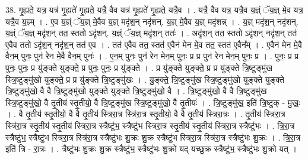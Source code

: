 \documentclass[17pt]{extarticle}
\begin{document}
38. गृ॒ह्यते॒ यत्र॒ यत्र॑ गृ॒ह्यते॑ गृ॒ह्यते॒ यत्रै॒ वैव यत्र॑ गृ॒ह्यते॑ गृ॒ह्यते॒ यत्रै॒व । . यत्रै॒ वैव यत्र॒ यत्रै॒व य॒ज्ञ्ं ॅय॒ज्ञ् मे॒व यत्र॒ यत्रै॒व य॒ज्ञ्म् । . ए॒व य॒ज्ञ्ं ॅय॒ज्ञ् मे॒वैव य॒ज्ञ् मदृ॑श॒न् नदृ॑शन्. य॒ज्ञ् मे॒वैव य॒ज्ञ् मदृ॑शन्न् । . य॒ज्ञ् मदृ॑श॒न् नदृ॑शन्. य॒ज्ञ्ं ॅय॒ज्ञ् मदृ॑श॒न् तत॒ स्ततो ऽदृ॑शन्. य॒ज्ञ्ं ॅय॒ज्ञ् मदृ॑श॒न् ततः॑ । . अदृ॑श॒न् तत॒ स्ततो ऽदृ॑श॒न् नदृ॑श॒न् तत॑ ए॒वैव ततो ऽदृ॑श॒न् नदृ॑श॒न् तत॑ ए॒व । . तत॑ ए॒वैव तत॒ स्तत॑ ए॒वैन॑ मेन मे॒व तत॒ स्तत॑ ए॒वैन᳚म् । . ए॒वैन॑ मेन मे॒वै वैन॒म् पुनः॒ पुन॑ रेन मे॒वै वैन॒म् पुनः॑ । . ए॒न॒म् पुनः॒ पुन॑ रेन मेन॒म् पुनः॒ प्र प्र पुन॑ रेन मेन॒म् पुनः॒ प्र । . पुनः॒ प्र प्र पुनः॒ पुनः॒ प्र यु॑ङ्क्ते युङ्क्ते॒ प्र पुनः॒ पुनः॒ प्र यु॑ङ्क्ते । . प्र यु॑ङ्क्ते युङ्क्ते॒ प्र प्र यु॑ङ्क्ते त्रि॒ष्टुङ्‌मु॑ख स्त्रि॒ष्टुङ्‌मु॑खो युङ्क्ते॒ प्र प्र यु॑ङ्क्ते त्रि॒ष्टुङ्‌मु॑खः । . यु॒ङ्क्ते॒ त्रि॒ष्टुङ्‌मु॑ख स्त्रि॒ष्टुङ्‌मु॑खो युङ्क्ते युङ्क्ते त्रि॒ष्टुङ्‌मु॑खो॒ वै वै त्रि॒ष्टुङ्‌मु॑खो युङ्क्ते युङ्क्ते त्रि॒ष्टुङ्‌मु॑खो॒ वै । . त्रि॒ष्टुङ्‌मु॑खो॒ वै वै त्रि॒ष्टुङ्‌मु॑ख स्त्रि॒ष्टुङ्‌मु॑खो॒ वै तृ॒तीय॑ स्तृ॒तीयो॒ वै त्रि॒ष्टुङ्‌मु॑ख स्त्रि॒ष्टुङ्‌मु॑खो॒ वै तृ॒तीयः॑ । . त्रि॒ष्टुङ्‌मु॑ख॒ इति॑ त्रि॒ष्टुक् - मु॒खः॒ । . वै तृ॒तीय॑ स्तृ॒तीयो॒ वै वै तृ॒तीय॑ स्त्रिरा॒त्र स्त्रि॑रा॒त्र स्तृ॒तीयो॒ वै वै तृ॒तीय॑ स्त्रिरा॒त्रः । . तृ॒तीय॑ स्त्रिरा॒त्र स्त्रि॑रा॒त्र स्तृ॒तीय॑ स्तृ॒तीय॑ स्त्रिरा॒त्र स्त्रैष्टु॑भ॒ स्त्रैष्टु॑भ स्त्रिरा॒त्र स्तृ॒तीय॑ स्तृ॒तीय॑ स्त्रिरा॒त्र स्त्रैष्टु॑भः । . त्रि॒रा॒त्र स्त्रैष्टु॑भ॒ स्त्रैष्टु॑भ स्त्रिरा॒त्र स्त्रि॑रा॒त्र स्त्रैष्टु॑भः शु॒क्रः शु॒क्र स्त्रैष्टु॑भ स्त्रिरा॒त्र स्त्रि॑रा॒त्र स्त्रैष्टु॑भः शु॒क्रः । . त्रि॒रा॒त्र इति॑ त्रि - रा॒त्रः । . त्रैष्टु॑भः शु॒क्रः शु॒क्र स्त्रैष्टु॑भ॒ स्त्रैष्टु॑भः शु॒क्रो यद् यच्छु॒क्र स्त्रैष्टु॑भ॒ स्त्रैष्टु॑भः शु॒क्रो यत् । \newline
\pagebreak
{}
\end{document}
